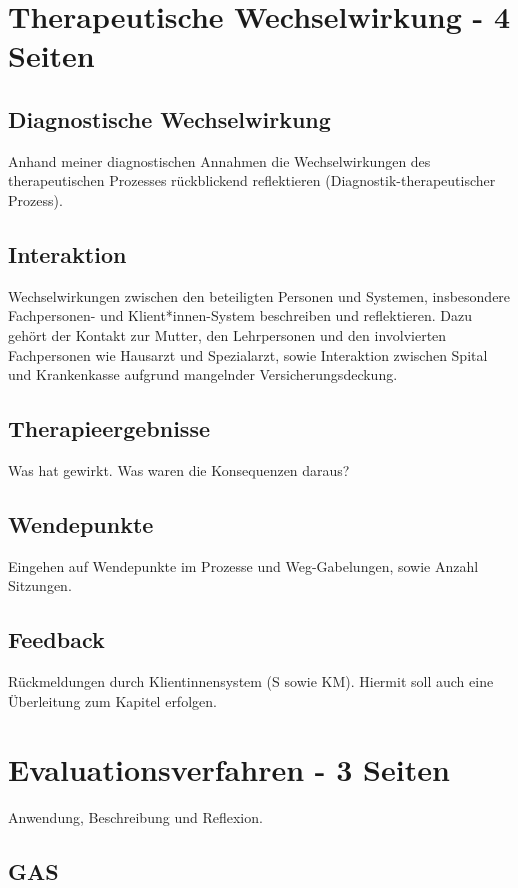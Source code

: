 
\section{Therapeutische Wechselwirkung - 4 Seiten} \label{TherapeutischeWechselwirkung}
\subsection{Diagnostische Wechselwirkung} Anhand meiner diagnostischen Annahmen die Wechselwirkungen des therapeutischen Prozesses rückblickend reflektieren (Diagnostik-therapeutischer Prozess). 
\subsection{Interaktion} Wechselwirkungen zwischen den beteiligten Personen und Systemen, insbesondere Fachpersonen- und Klient*innen-System beschreiben und reflektieren. Dazu gehört der Kontakt zur Mutter, den Lehrpersonen und den involvierten Fachpersonen wie Hausarzt und Spezialarzt, sowie Interaktion zwischen Spital und Krankenkasse aufgrund mangelnder Versicherungsdeckung.
\subsection{Therapieergebnisse} Was hat gewirkt. Was waren die Konsequenzen daraus?
\subsection{Wendepunkte} Eingehen auf Wendepunkte im Prozesse und Weg-Gabelungen, sowie Anzahl Sitzungen.
\subsection{Feedback} Rückmeldungen durch Klientinnensystem (S sowie KM). Hiermit soll auch eine Überleitung zum Kapitel  erfolgen.

\section{Evaluationsverfahren - 3 Seiten}\label{Evaluationsverfahren}
Anwendung, Beschreibung und Reflexion.
\subsection{GAS}
